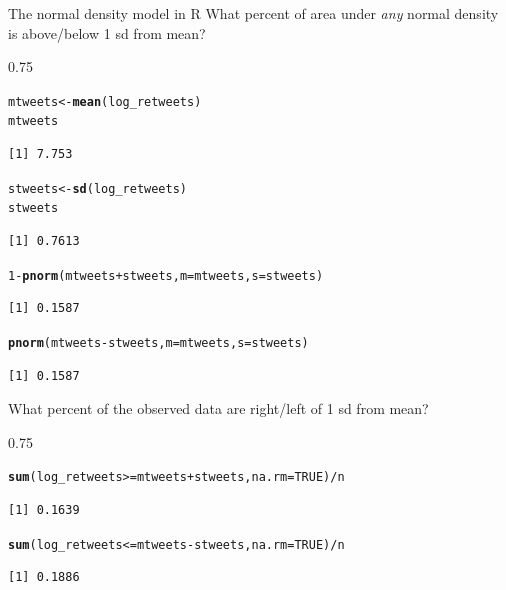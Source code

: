 \documentclass{beamer}\usepackage[]{graphicx}\usepackage[]{color}
\makeatletter
\newcommand{\hlnum}[1]{\textcolor[rgb]{0.2,0.2,0.2}{#1}}%
\newcommand{\hlopt}[1]{\textcolor[rgb]{0.102,0.102,0.102}{#1}}%
\newcommand{\hlstd}[1]{\textcolor[rgb]{0.102,0.102,0.102}{#1}}%
\newcommand{\hlkwb}[1]{\textcolor[rgb]{0.102,0.102,0.102}{#1}}%
\newcommand{\hlkwc}[1]{\textcolor[rgb]{0.2,0.2,0.2}{#1}}%
\newcommand{\hlkwd}[1]{\textcolor[rgb]{0.102,0.102,0.102}{\textbf{#1}}}%
\newenvironment{kframe}{%
 \def\at@end@of@kframe{}%
 \ifinner\ifhmode%
  \def\at@end@of@kframe{\end{minipage}}%
  \begin{minipage}{\columnwidth}%
 \fi\fi%
 \def\FrameCommand##1{\hskip\@totalleftmargin \hskip-\fboxsep
 \colorbox{shadecolor}{##1}\hskip-\fboxsep
     \hskip-\linewidth \hskip-\@totalleftmargin \hskip\columnwidth}%
 \MakeFramed {\advance\hsize-\width
   \@totalleftmargin\z@ \linewidth\hsize
   \@setminipage}}%
 {\par\unskip\endMakeFramed%
 \at@end@of@kframe}
\newenvironment{knitrout}{}{} %
\renewenvironment{knitrout}{\begin{spacing}{0.75}\begin{tiny}}{\end{tiny}\end{spacing}}
\makeatother
\begin{document}
\begin{frame}{The normal density model in R\;\;}
What percent of area under \emph{any} normal density is above/below 1 sd from mean?
\begin{knitrout}\small
{}\color{fgcolor}\begin{kframe}
\begin{alltt}
\hlstd{mtweets} \hlkwb{<-} \hlkwd{mean}\hlstd{(log_retweets)}
\hlstd{mtweets}
\end{alltt}
\begin{verbatim}
[1] 7.753
\end{verbatim}
\begin{alltt}
\hlstd{stweets} \hlkwb{<-} \hlkwd{sd}\hlstd{(log_retweets)}
\hlstd{stweets}
\end{alltt}
\begin{verbatim}
[1] 0.7613
\end{verbatim}
\begin{alltt}
\hlnum{1} \hlopt{-} \hlkwd{pnorm}\hlstd{(mtweets} \hlopt{+} \hlstd{stweets,} \hlkwc{m}\hlstd{=mtweets,} \hlkwc{s}\hlstd{=stweets)}
\end{alltt}
\begin{verbatim}
[1] 0.1587
\end{verbatim}
\begin{alltt}
\hlkwd{pnorm}\hlstd{(mtweets} \hlopt{-} \hlstd{stweets,} \hlkwc{m}\hlstd{=mtweets,} \hlkwc{s}\hlstd{=stweets)}
\end{alltt}
\begin{verbatim}
[1] 0.1587
\end{verbatim}
\end{kframe}
\end{knitrout}
\newpage

What percent of the observed data are right/left of 1 sd from mean?


\begin{knitrout}\small
{}\color{fgcolor}\begin{kframe}
\begin{alltt}
\hlkwd{sum}\hlstd{(log_retweets} \hlopt{>=} \hlstd{mtweets} \hlopt{+} \hlstd{stweets,} \hlkwc{na.rm}\hlstd{=}\hlnum{TRUE}\hlstd{)} \hlopt{/} \hlstd{n}
\end{alltt}
\begin{verbatim}
[1] 0.1639
\end{verbatim}
\begin{alltt}
\hlkwd{sum}\hlstd{(log_retweets} \hlopt{<=} \hlstd{mtweets} \hlopt{-} \hlstd{stweets,} \hlkwc{na.rm}\hlstd{=}\hlnum{TRUE}\hlstd{)} \hlopt{/} \hlstd{n}
\end{alltt}
\begin{verbatim}
[1] 0.1886
\end{verbatim}
\end{kframe}
\end{knitrout}
\newpage


\end{frame}
\end{document}

